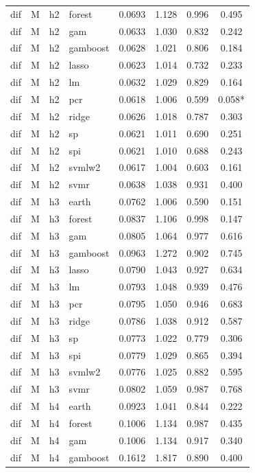 \begin{ThreePartTable}
\begin{longtable}[t]{llclcccc}
dif & M & h2 & forest & 0.0693 & 1.128 & 0.996 & 0.495\\
dif & M & h2 & gam & 0.0633 & 1.030 & 0.832 & 0.242\\
dif & M & h2 & gamboost & 0.0628 & 1.021 & 0.806 & 0.184\\
dif & M & h2 & lasso & 0.0623 & 1.014 & 0.732 & 0.233\\
dif & M & h2 & lm & 0.0632 & 1.029 & 0.829 & 0.164\\
dif & M & h2 & pcr & 0.0618 & 1.006 & 0.599 & 0.058*\\
dif & M & h2 & ridge & 0.0626 & 1.018 & 0.787 & 0.303\\
dif & M & h2 & sp & 0.0621 & 1.011 & 0.690 & 0.251\\
dif & M & h2 & spi & 0.0621 & 1.010 & 0.688 & 0.243\\
dif & M & h2 & svmlw2 & 0.0617 & 1.004 & 0.603 & 0.161\\
dif & M & h2 & svmr & 0.0638 & 1.038 & 0.931 & 0.400\\
\addlinespace
dif & M & h3 & earth & 0.0762 & 1.006 & 0.590 & 0.151\\
dif & M & h3 & forest & 0.0837 & 1.106 & 0.998 & 0.147\\
dif & M & h3 & gam & 0.0805 & 1.064 & 0.977 & 0.616\\
dif & M & h3 & gamboost & 0.0963 & 1.272 & 0.902 & 0.745\\
dif & M & h3 & lasso & 0.0790 & 1.043 & 0.927 & 0.634\\
dif & M & h3 & lm & 0.0793 & 1.048 & 0.939 & 0.476\\
dif & M & h3 & pcr & 0.0795 & 1.050 & 0.946 & 0.683\\
dif & M & h3 & ridge & 0.0786 & 1.038 & 0.912 & 0.587\\
dif & M & h3 & sp & 0.0773 & 1.022 & 0.779 & 0.306\\
dif & M & h3 & spi & 0.0779 & 1.029 & 0.865 & 0.394\\
dif & M & h3 & svmlw2 & 0.0776 & 1.025 & 0.882 & 0.595\\
dif & M & h3 & svmr & 0.0802 & 1.059 & 0.987 & 0.768\\
\addlinespace
dif & M & h4 & earth & 0.0923 & 1.041 & 0.844 & 0.222\\
dif & M & h4 & forest & 0.1006 & 1.134 & 0.987 & 0.435\\
dif & M & h4 & gam & 0.1006 & 1.134 & 0.917 & 0.340\\
dif & M & h4 & gamboost & 0.1612 & 1.817 & 0.890 & 0.400\\

\end{longtable}
\end{ThreePartTable}
